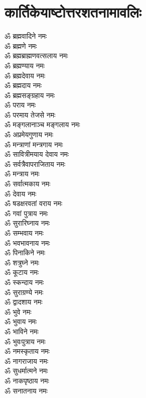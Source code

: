 \section{कार्तिकेयाष्टोत्तरशतनामावलिः}
\begin{multicols}{2}
\begin{flushleft}
ॐ ब्रह्मवादिने नमः\\
ॐ ब्रह्मणे नमः\\
ॐ ब्रह्मब्राह्मणवत्सलाय नमः\\
ॐ ब्रह्मण्याय नमः\\
ॐ ब्रह्मदेवाय नमः\\
ॐ ब्रह्मदाय नमः\\
ॐ ब्रह्मसङ्ग्रहाय नमः\\
ॐ पराय नमः\\
ॐ परमाय तेजसे नमः\\
ॐ मङ्गलानाञ्च मङ्गलाय नमः\hfill{}\\
ॐ अप्रमेयगुणाय नमः\\
ॐ मन्त्राणां मन्त्रगाय नमः\\
ॐ सावित्रीमयाय देवाय नमः\\
ॐ सर्वत्रैवापराजिताय नमः\\
ॐ मन्त्राय नमः\\
ॐ सर्वात्मकाय नमः\\
ॐ देवाय नमः\\
ॐ षडक्षरवतां वराय नमः\\
ॐ गवां पुत्राय नमः\\
ॐ सुरारिघ्नाय नमः\hfill{}\\
ॐ सम्भवाय नमः\\
ॐ भवभावनाय नमः\\
ॐ पिनाकिने नमः\\
ॐ शत्रुघ्ने नमः\\
ॐ कूटाय नमः\\
ॐ स्कन्दाय नमः\\
ॐ सुराग्रण्ये नमः\\
ॐ द्वादशाय नमः\\
ॐ भुवे नमः\\
ॐ भुवाय नमः\hfill{}\\
ॐ भाविने नमः\\
ॐ भुवःपुत्राय नमः\\
ॐ नमस्कृताय नमः\\
ॐ नागराजाय नमः\\
ॐ सुधर्मात्मने नमः\\
ॐ नाकपृष्ठाय नमः\\
ॐ सनातनाय नमः\\

\end{flushleft}
\end{multicols}
